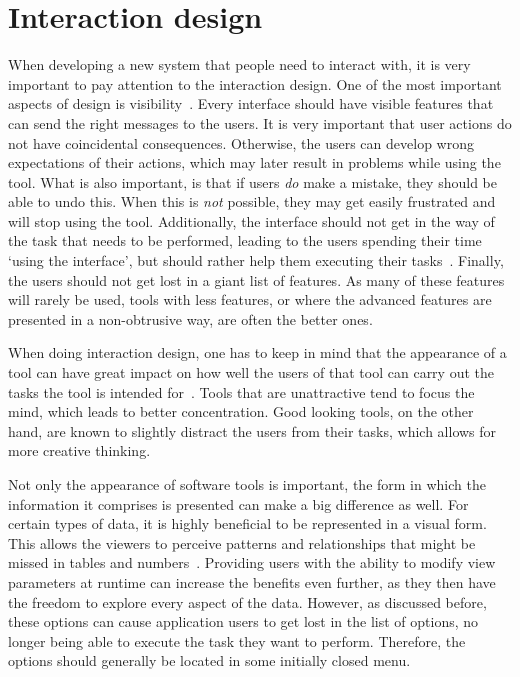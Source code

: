 \section{Interaction design}
When developing a new system that people need to interact with, it is very important to pay attention to the interaction design. One of the most important aspects of design is visibility~\cite{norman2002design}. Every interface should have visible features that can send the right messages to the users. It is very important that user actions do not have coincidental consequences. Otherwise, the users can develop wrong expectations of their actions, which may later result in problems while using the tool. What is also important, is that if users \emph{do} make a mistake, they should be able to undo this. When this is \emph{not} possible, they may get easily frustrated and will stop using the tool. Additionally, the interface should not get in the way of the task that needs to be performed, leading to the users spending their time `using the interface', but should rather help them executing their tasks~\cite{norman1990interfaces}. Finally, the users should not get lost in a giant list of features. As many of these features will rarely be used, tools with less features, or where the advanced features are presented in a non-obtrusive way, are often the better ones.

When doing interaction design, one has to keep in mind that the appearance of a tool can have great impact on how well the users of that tool can carry out the tasks the tool is intended for~\cite{norman2002emotion}. Tools that are unattractive tend to focus the mind, which leads to better concentration. Good looking tools, on the other hand, are known to slightly distract the users from their tasks, which allows for more creative thinking.

Not only the appearance of software tools is important, the form in which the information it comprises is presented can make a big difference as well. For certain types of data, it is highly beneficial to be represented in a visual form. This allows the viewers to perceive patterns and relationships that might be missed in tables and numbers~\cite{gallopoulos1994computer}. Providing users with the ability to modify view parameters at runtime can increase the benefits even further, as they then have the freedom to explore every aspect of the data. However, as discussed before, these options can cause application users to get lost in the list of options, no longer being able to execute the task they want to perform. Therefore, the options should generally be located in some initially closed menu.


